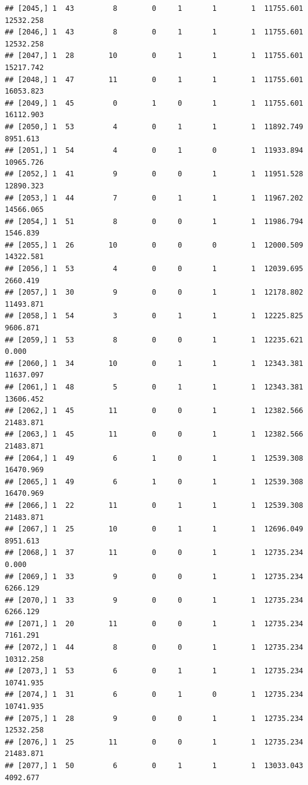 \documentclass[
]{article}
\begin{document}
\begin{verbatim}
## [2045,] 1  43         8        0     1       1        1  11755.601  12532.258
## [2046,] 1  43         8        0     1       1        1  11755.601  12532.258
## [2047,] 1  28        10        0     1       1        1  11755.601  15217.742
## [2048,] 1  47        11        0     1       1        1  11755.601  16053.823
## [2049,] 1  45         0        1     0       1        1  11755.601  16112.903
## [2050,] 1  53         4        0     1       1        1  11892.749   8951.613
## [2051,] 1  54         4        0     1       0        1  11933.894  10965.726
## [2052,] 1  41         9        0     0       1        1  11951.528  12890.323
## [2053,] 1  44         7        0     1       1        1  11967.202  14566.065
## [2054,] 1  51         8        0     0       1        1  11986.794   1546.839
## [2055,] 1  26        10        0     0       0        1  12000.509  14322.581
## [2056,] 1  53         4        0     0       1        1  12039.695   2660.419
## [2057,] 1  30         9        0     0       1        1  12178.802  11493.871
## [2058,] 1  54         3        0     1       1        1  12225.825   9606.871
## [2059,] 1  53         8        0     0       1        1  12235.621      0.000
## [2060,] 1  34        10        0     1       1        1  12343.381  11637.097
## [2061,] 1  48         5        0     1       1        1  12343.381  13606.452
## [2062,] 1  45        11        0     0       1        1  12382.566  21483.871
## [2063,] 1  45        11        0     0       1        1  12382.566  21483.871
## [2064,] 1  49         6        1     0       1        1  12539.308  16470.969
## [2065,] 1  49         6        1     0       1        1  12539.308  16470.969
## [2066,] 1  22        11        0     1       1        1  12539.308  21483.871
## [2067,] 1  25        10        0     1       1        1  12696.049   8951.613
## [2068,] 1  37        11        0     0       1        1  12735.234      0.000
## [2069,] 1  33         9        0     0       1        1  12735.234   6266.129
## [2070,] 1  33         9        0     0       1        1  12735.234   6266.129
## [2071,] 1  20        11        0     0       1        1  12735.234   7161.291
## [2072,] 1  44         8        0     0       1        1  12735.234  10312.258
## [2073,] 1  53         6        0     1       1        1  12735.234  10741.935
## [2074,] 1  31         6        0     1       0        1  12735.234  10741.935
## [2075,] 1  28         9        0     0       1        1  12735.234  12532.258
## [2076,] 1  25        11        0     0       1        1  12735.234  21483.871
## [2077,] 1  50         6        0     1       1        1  13033.043   4092.677

\end{verbatim}
\end{document}
